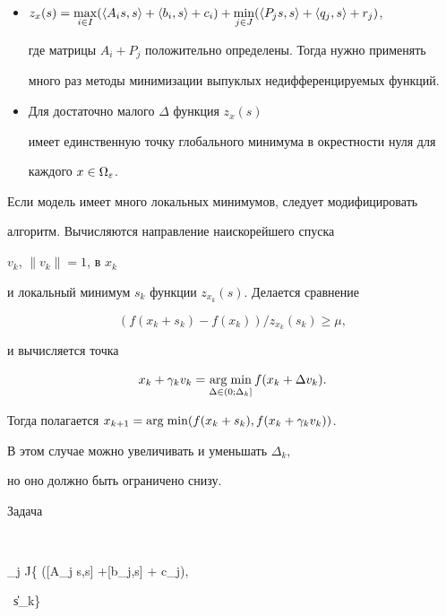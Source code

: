 \begin{itemize}


\item[2)]


$z_x (s)=\max\limits_{i \in I}(\la A_i s,s\ra+\la b_i,s\ra+c_i)+


\min\limits_{j \in J} (\la P_j s,s\ra+ \la q_j ,s\ra + r_j)$,


где матрицы $A_i + P_j$ положительно определены. Тогда нужно применять


много раз методы минимизации выпуклых недифференцируемых функций.


\item[3)] Для достаточно малого $\Delta$ функция $z_x (s)$


имеет единственную точку глобального минимума в окрестности нуля для


каждого $x \in \Omega_{\varepsilon}$.


\end{itemize}





Если модель имеет много локальных минимумов, следует модифицировать


алгоритм. Вычисляются направление наискорейшего спуска


$v_k$, $\|v_k\|=1$, в $x_k$


и локальный минимум $s_k$ функции $z_{x_{k}} (s)$. Делается сравнение


$$


(f(x_k + s_k) - f(x_k))/ z_{x_{k}} (s_k) \geq \mu,


$$


и вычисляется точка


$$


x_k + \gamma_k v_k = \argmin_{\Delta \in (0;\Delta_k]} f(x_k + \Delta


v_k).


$$


Тогда полагается $x_{k+1}=\argmin( f(x_k+s_k), f(x_k + \gamma_k v_k))$.


В этом случае можно увеличивать и уменьшать $\Delta_k$,


но оно должно быть ограничено снизу.





Задача


$$


\min \max_{j \in J}\{ ([A_j s,s] +[b_j,s] + c_j),


\ \|s\| \leq \Delta_k\}


